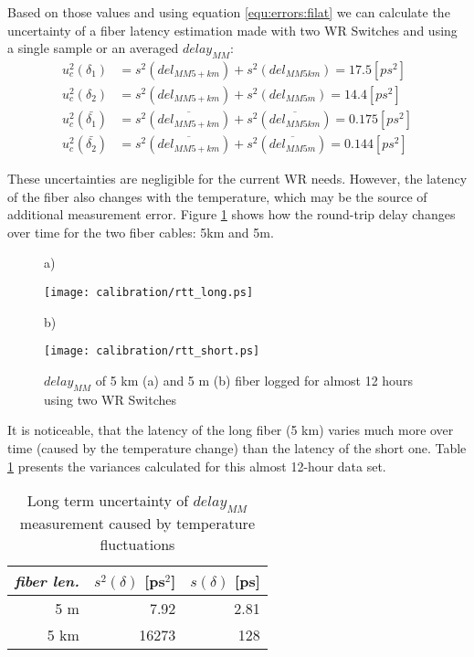 Based on those values and using equation \ref{equ:errors:filat} we can calculate
the uncertainty of a fiber latency estimation made with two WR Switches and
using a single sample or an averaged $delay_{MM}$:
\begin{align}
	\label{equ:errors:f1lat}
  u_c^2(\delta_1) &= s^2(del_{MM5+km}) + s^2(del_{MM5km}) = 17.5 [ps^2]\\
	u_c^2(\delta_2) &= s^2(del_{MM5+km}) + s^2(del_{MM5m}) = 14.4 [ps^2]\\
	u_c^2(\bar{\delta_1}) &= s^2(\overline{del_{MM5+km}}) + s^2(\overline{del_{MM5km}}) = 0.175 [ps^2]\\
	u_c^2(\bar{\delta_2}) &= s^2(\overline{del_{MM5+km}}) + s^2(\overline{del_{MM5m}}) = 0.144 [ps^2]
\end{align}

These uncertainties are negligible for the current WR needs. However, the
latency of the fiber also changes with the temperature, which may be the source
of additional measurement error. Figure \ref{fig:errors:deltemp} shows how the
round-trip delay changes over time for the two fiber cables: 5km and 5m. 

\begin{center}
\begin{figure}[ht]
a)
\begin{minipage}{.5\textwidth}
	\texttt{[image: calibration/rtt\_long.ps]}
\end{minipage}
b)
\begin{minipage}{.5\textwidth}
	\texttt{[image: calibration/rtt\_short.ps]}
\end{minipage}
\caption{$delay_{MM}$ of 5 km (a) and 5 m (b) fiber logged for almost 12 hours using two WR Switches}
\label{fig:errors:deltemp}
\end{figure}
\end{center}

It is noticeable, that the latency of the long fiber (5 km) varies much more
over time (caused by the temperature change) than the latency of the short one.
Table \ref{tab:errors:deltemp} presents the variances calculated for this almost
12-hour data set.
\renewcommand{\arraystretch}{1.2}
\begin{table}[ht]
	\begin{center}
	\begin{tabular}{|r|r|r|}
	\hline
  \emph{fiber len.} & $s^2(\delta)$ [ps$^2$] & $s(\delta)$ [ps]\\
	\hline
	5 m & 7.92 & 2.81\\
	\hline
	5 km & 16273 & 128\\
	\hline
	\end{tabular}
	\caption{Long term uncertainty of $delay_{MM}$ measurement caused by temperature fluctuations}
	\label{tab:errors:deltemp}
	\end{center}
\end{table}
\renewcommand{\arraystretch}{1}

